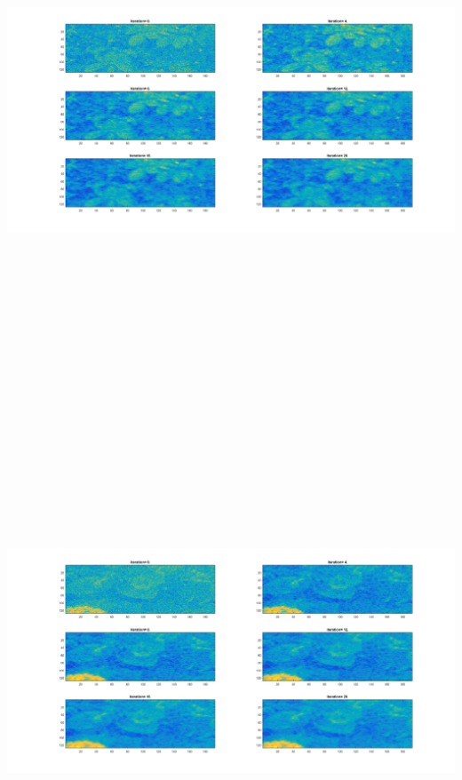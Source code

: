 \documentclass[11pt]{scrartcl}
\begin{document}
\includegraphics[width=160mm,height=160mm]{D2_10_20.png}\\
\includegraphics[width=160mm,height=160mm]{D3_10_20.png}\\
\end{document}
